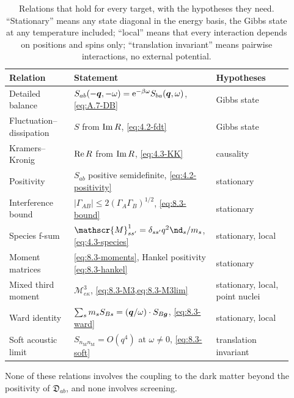 \begin{table}[tbp]
  \centering
  \small
  \caption{Relations that hold for every target, with the hypotheses they need. ``Stationary'' means any state diagonal in the energy basis, the Gibbs state at any temperature included; ``local'' means that every interaction depends on positions and spins only; ``translation invariant'' means pairwise interactions, no external potential.}
  \label{tab:8-exact}
  \begin{tabular}{@{}p{0.22\linewidth}p{0.44\linewidth}p{0.26\linewidth}@{}}
    \toprule
    Relation & Statement & Hypotheses \\
    \midrule
    Detailed balance & $S_{ab}(-\bm{q},-\omega) = \mathrm{e}^{-\beta\omega}S_{ba}(\bm{q},\omega)$, \cref{eq:A.7-DB} & Gibbs state \\
    Fluctuation--dissipation & $S$ from $\operatorname{Im} R$, \cref{eq:4.2-fdt} & Gibbs state \\
    Kramers--Kronig & $\operatorname{Re} R$ from $\operatorname{Im} R$, \cref{eq:4.3-KK} & causality \\
    Positivity & $S_{ab}$ positive semidefinite, \cref{eq:4.2-positivity} & stationary \\
    Interference bound & $|\varGamma_{AB}| \le 2(\varGamma_A\varGamma_B)^{1/2}$, \cref{eq:8.3-bound} & stationary \\
    Species f-sum & $\mathscr{M}^1_{ss'} = \delta_{ss'}q^2\nd_s/m_s$, \cref{eq:4.3-species} & stationary, local \\
    Moment matrices & \cref{eq:8.3-moments}, Hankel positivity \cref{eq:8.3-hankel} & stationary \\
    Mixed third moment & $\mathscr{M}^3_{e\kappa}$, \cref{eq:8.3-M3,eq:8.3-M3lim} & stationary, local, point nuclei \\
    Ward identity & $\sum_sm_sS_{Bs} = (\bm{q}/\omega)\cdot S_{B\bm{g}}$, \cref{eq:8.3-ward} & stationary, local \\
    Soft acoustic limit & $S_{n_{\mathrm{M}}n_{\mathrm{M}}} = O(q^4)$ at $\omega \ne 0$, \cref{eq:8.3-soft} & translation invariant \\
    \bottomrule
  \end{tabular}
\end{table}

None of these relations involves the coupling to the dark matter beyond the positivity of $\mathfrak{D}_{ab}$, and none involves screening.
